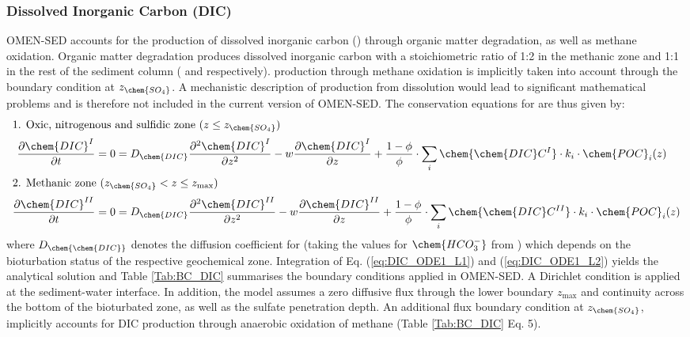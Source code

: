 \documentclass[gmd, manuscript]{copernicus}
\begin{document}
\subsubsection{Dissolved Inorganic Carbon (DIC)}\label{subsubsec:DIC}
OMEN-SED accounts for the production of dissolved inorganic carbon () through organic matter degradation, as well as methane oxidation. 
Organic matter degradation produces dissolved inorganic carbon with a stoichiometric  ratio of 1:2 in the methanic zone and 1:1 in the rest of the sediment column ( and  respectively). 
 production through methane oxidation is implicitly taken into account through the boundary condition at $z_{\chem{SO_4}}$. 
A mechanistic description of  production from  dissolution %
would lead to significant mathematical problems and is therefore not included in the current version of OMEN-SED. 
The conservation equations for  are thus given by:
\begin{align}
\intertext{1. Oxic, nitrogenous and sulfidic zone ($z \leq z_{\chem{SO_4}}$)}
  \frac{\partial \chem{DIC}^I}{\partial t} &= 0 = D_{\chem{DIC}} \frac{\partial^2\chem{DIC}^I }{\partial z^2} - w\frac{\partial \chem{DIC}^I }{\partial z} + \frac{1-\phi}{\phi} \cdot \sum_i \chem{\chem{DIC}C^I} \cdot k_i \cdot \chem{POC}_{i}(z)\label{eq:DIC_ODE1_L1}\\ %
 \intertext{2. Methanic zone ($z_{\chem{SO_4}} < z \leq z_\mathrm{max}$)} 
  \frac{\partial \chem{DIC}^{II}}{\partial t} &= 0 = D_{\chem{DIC}} \frac{\partial^2\chem{DIC}^{II} }{\partial z^2} - w\frac{\partial \chem{DIC}^{II} }{\partial z} + \frac{1-\phi}{\phi} \cdot \sum_i \chem{\chem{DIC}C^{II}} \cdot k_i \cdot \chem{POC}_{i}(z)\label{eq:DIC_ODE1_L2} %
\end{align}
where $D_\chem{\chem{DIC}}$ denotes the diffusion coefficient for  (taking the values for $\chem{HCO_3^{-}}$ from \citet{schulz_quantification_2006}) which depends on the bioturbation status of the respective geochemical zone. 
Integration of Eq. (\ref{eq:DIC_ODE1_L1}) and (\ref{eq:DIC_ODE1_L2}) yields the analytical solution and Table \ref{Tab:BC_DIC} summarises the boundary conditions applied in OMEN-SED. 
A Dirichlet condition is applied at the sediment-water interface. In addition, the model assumes a zero diffusive flux through the lower boundary $z_\mathrm{max}$ and continuity across the bottom of the bioturbated zone, as well as the sulfate penetration depth. An additional flux boundary condition at $z_{\chem{SO_4}}$, implicitly accounts for DIC production through anaerobic oxidation of methane  (Table \ref{Tab:BC_DIC} Eq. 5).
\end{document}
